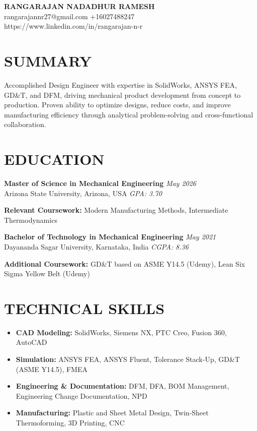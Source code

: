 \documentclass[a4paper,10pt]{article}
\begin{document}
\begin{center}
  {\large \textbf{RANGARAJAN NADADHUR RAMESH}} \\[2pt]
  {\small rangarajannr27@gmail.com \textbar{} +16027488247 \textbar{} https://www.linkedin.com/in/rangarajan-n-r}
\end{center}

\vspace{2pt}

\section{SUMMARY}

Accomplished Design Engineer with expertise in SolidWorks, ANSYS FEA, GD\&T, and DFM, driving mechanical product development from concept to production.
Proven ability to optimize designs, reduce costs, and improve manufacturing efficiency through analytical problem-solving and cross-functional collaboration.

\section{EDUCATION}

\noindent \textbf{Master of Science in Mechanical Engineering} \hfill \textit{May 2026} \\
Arizona State University, Arizona, USA \hfill \textit{GPA: 3.70}

\vspace{2pt}
\noindent \textbf{Relevant Coursework:} Modern Manufacturing Methods, Intermediate Thermodynamics

\vspace{4pt}

\noindent \textbf{Bachelor of Technology in Mechanical Engineering} \hfill \textit{May 2021} \\
Dayananda Sagar University, Karnataka, India \hfill \textit{CGPA: 8.36}

\vspace{2pt}
\noindent \textbf{Additional Coursework:} GD\&T based on ASME Y14.5 (Udemy), Lean Six Sigma Yellow Belt (Udemy)

\section{TECHNICAL SKILLS}

\begin{itemize}[leftmargin=0.15in, itemsep=0pt, parsep=0pt, topsep=2pt]
  \item \textbf{CAD Modeling:} SolidWorks, Siemens NX, PTC Creo, Fusion 360, AutoCAD
\item \textbf{Simulation:} ANSYS FEA, ANSYS Fluent, Tolerance Stack-Up, GD&T (ASME Y14.5), FMEA
\item \textbf{Engineering & Documentation:} DFM, DFA, BOM Management, Engineering Change Documentation, NPD
\item \textbf{Manufacturing:} Plastic and Sheet Metal Design, Twin-Sheet Thermoforming, 3D Printing, CNC
\end{itemize}
\end{document}
